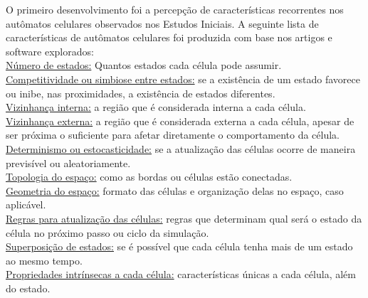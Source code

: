 \documentclass[11pt,a4paper,twocolumn,final]{article}
\begin{document}
O primeiro desenvolvimento foi a percepção de características recorrentes nos autômatos celulares observados nos Estudos Iniciais.
A seguinte lista de características de autômatos celulares foi produzida com base nos artigos e software explorados:\\
\underline{Número de estados:} Quantos estados cada célula pode assumir.\\
\underline{Competitividade ou simbiose entre estados:} se a existência de um estado favorece ou inibe, nas proximidades, a existência de estados diferentes.\\
\underline{Vizinhança interna:} a região que é considerada interna a cada célula.\\
\underline{Vizinhança externa:} a região que é considerada externa a cada célula, apesar de ser próxima o suficiente para afetar diretamente o comportamento da célula.\\
\underline{Determinismo ou estocasticidade:} se a atualização das células ocorre de maneira previsível ou aleatoriamente.\\
\underline{Topologia do espaço:} como as bordas ou células estão conectadas.\\
\underline{Geometria do espaço:} formato das células e organização delas no espaço, caso aplicável.\\
\underline{Regras para atualização das células:} regras que determinam qual será o estado da célula no próximo passo ou ciclo da simulação.\\
\underline{Superposição de estados:} se é possível que cada célula tenha mais de um estado ao mesmo tempo.\\
\underline{Propriedades intrínsecas a cada célula:} características únicas a cada célula, além do estado.
\end{document}
